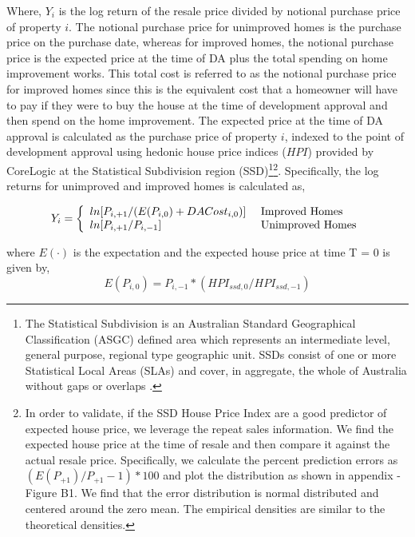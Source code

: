 \documentclass[AEJ,reqno, draftmode]{AEA} %
\begin{document}
Where, $Y_i$ is the log return of the resale price divided by notional purchase price of property $i$. The notional purchase price for unimproved homes is the purchase price on the purchase date, whereas for improved homes, the notional purchase price is the expected price at the time of DA plus the total spending on home improvement works. This total cost is referred to as the notional purchase price for improved homes since this is the equivalent cost that a homeowner will have to pay if they were to buy the house at the time of development approval and then spend on the home improvement. The expected price at the time of DA approval is calculated as the purchase price of property $i$, indexed to the point of development approval using hedonic house price indices ($HPI$) provided by CoreLogic at the Statistical Subdivision region (SSD)\footnote{The Statistical Subdivision is an Australian Standard Geographical Classification (ASGC) defined area which represents an intermediate level, general purpose, regional type geographic unit. SSDs consist of one or more Statistical Local Areas (SLAs) and cover, in aggregate, the whole of Australia without gaps or overlaps \citep{SSD}.}\footnote{In order to validate, if the SSD House Price Index are a good predictor of expected house price, we leverage the repeat sales information. We find the expected house price at the time of resale and then compare it against the actual resale price. Specifically, we calculate the percent prediction errors as $(E(P_{+1})/P_{+1}-1)*100$ and plot the distribution as shown in appendix - Figure B1. We find that the error distribution is normal distributed and centered around the zero mean. The empirical densities are similar to the theoretical densities.}. Specifically, the log returns for unimproved and improved homes is calculated as,

\begin{equation}
    Y_i = \left\{
    \begin{array}{l l}
      ln[P_{i,+1}/(E(P_{i,0})+ DACost_{i,0})] & \text{ Improved Homes}\\
      ln[P_{i,+1}/P_{i,-1}] & \text{ Unimproved Homes} \\
    \end{array} \right.
\end{equation}

where $E(\cdot)$ is the expectation and the expected house price at time T = 0 is given by, \begin{equation}
    E(P_{i,0}) = P_{i,-1} * (HPI_{ssd,0} / HPI_{ssd,-1})
\end{equation}
\end{document}
